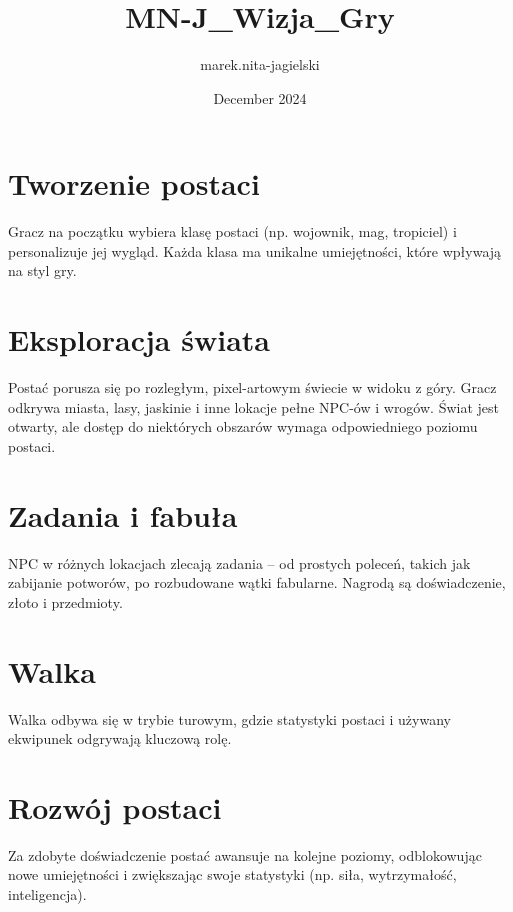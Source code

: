 \documentclass{article}
\title{MN-J_Wizja_Gry}
\author{marek.nita-jagielski }
\date{December 2024}
\begin{document}
\section{Tworzenie postaci}
Gracz na początku wybiera klasę postaci (np. wojownik, mag, tropiciel) i personalizuje jej wygląd. 
Każda klasa ma unikalne umiejętności, które wpływają na styl gry.

\section{Eksploracja świata}
Postać porusza się po rozległym, pixel-artowym świecie w widoku z góry. 
Gracz odkrywa miasta, lasy, jaskinie i inne lokacje pełne NPC-ów i wrogów. 
Świat jest otwarty, ale dostęp do niektórych obszarów wymaga odpowiedniego poziomu postaci.

\section{Zadania i fabuła}
NPC w różnych lokacjach zlecają zadania – od prostych poleceń, takich jak zabijanie potworów, 
po rozbudowane wątki fabularne. Nagrodą są doświadczenie, złoto i przedmioty.

\section{Walka}
Walka odbywa się w trybie turowym, gdzie statystyki postaci i używany ekwipunek odgrywają kluczową rolę. 

\section{Rozwój postaci}
Za zdobyte doświadczenie postać awansuje na kolejne poziomy, odblokowując nowe umiejętności i 
zwiększając swoje statystyki (np. siła, wytrzymałość, inteligencja).
\end{document}
